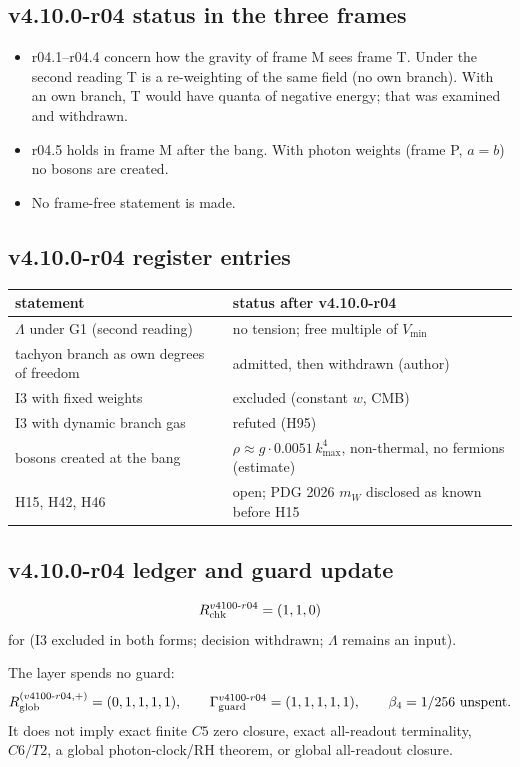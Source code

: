 \subsection*{v4.10.0-r04 status in the three frames}
\label{subsec:v4100-r04-frames}

\begin{itemize}[leftmargin=2em]
\item r04.1--r04.4 concern how the gravity of frame M sees frame T.  Under the second reading T is a re-weighting of the same field (no own branch).
With an own branch, T would have quanta of negative energy; that was examined and withdrawn.
\item r04.5 holds in frame M after the bang.  With photon weights (frame P, \(a=b\)) no bosons are created.
\item No frame-free statement is made.
\end{itemize}

\subsection*{v4.10.0-r04 register entries}
\label{subsec:v4100-r04-register}

\begin{center}
\small
\begin{tabular}{@{}>{\raggedright\arraybackslash}p{}>{\raggedright\arraybackslash}p{}@{}}
\toprule
statement & status after v4.10.0-r04\\
\midrule
\(\Lambda\) under G1 (second reading) & no tension; free multiple of \(V_{\min}\)\\
tachyon branch as own degrees of freedom & admitted, then withdrawn (author)\\
I3 with fixed weights & excluded (constant \(w\), CMB)\\
I3 with dynamic branch gas & refuted (H95)\\
bosons created at the bang & \(\rho\approx g\cdot0.0051\,k_{\max}^4\), non-thermal, no fermions (estimate)\\
H15, H42, H46 & open; PDG 2026 \(m_W\) disclosed as known before H15\\
\bottomrule
\end{tabular}
\end{center}

\subsection*{v4.10.0-r04 ledger and guard update}
\label{subsec:v4100-r04-ledger-guard}

\[
R_{\rm chk}^{v4100\text{-}r04}=(1,1,0)
\]
for (I3 excluded in both forms; decision withdrawn; \(\Lambda\) remains an input).

The layer spends no guard:
\[
R_{\rm glob}^{(v4100\text{-}r04,+)}=(0,1,1,1,1),
\qquad
\Gamma_{\rm guard}^{v4100\text{-}r04}=(1,1,1,1,1),
\qquad
\beta_4=1/256\ \text{unspent}.
\]
It does not imply exact finite \(C5\) zero closure, exact all-readout terminality,
\(C6/T2\), a global photon-clock/RH theorem, or global all-readout closure.
